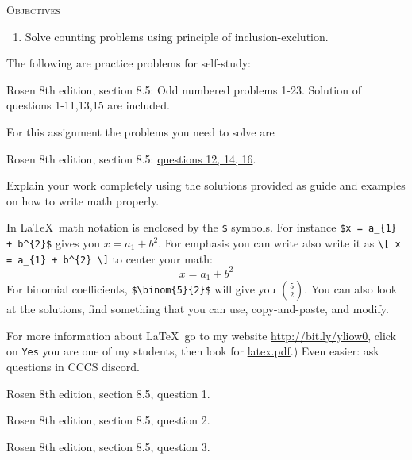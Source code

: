 


\renewcommand\AUTHOR{nweadick1@cougars.ccis.edu} %


\topmattertwo

\textsc{Objectives}
\begin{enumerate}
\item Solve counting problems using principle of
inclusion-exclution.
\end{enumerate}
\vspace{1cm}

The following are practice problems for self-study:
\begin{enumerate}[nosep]
\li Rosen 8th edition, section 8.5: Odd numbered problems 1-23.
Solution of questions 1-11,13,15 are included.
\end{enumerate}
For this assignment the problems you need to solve are
\begin{enumerate}[nosep]
\li Rosen 8th edition, section 8.5: \underline{questions 12, 14, 16}.
\end{enumerate}
Explain your work completely using the solutions provided as
guide and examples on how to write math properly.

In \LaTeX\, math notation is enclosed by the \verb!$! symbols.
For instance \verb!$x = a_{1} + b^{2}$! gives you $x = a_{1} + b^{2}$.
For emphasis you can write also write it as
\verb!\[ x = a_{1} + b^{2} \]!
to center your math:
\[
x = a_{1} + b^{2}
\]
For binomial coefficients, \verb!$\binom{5}{2}$! will give you 
$\binom{5}{2}$.
You can also look at the solutions, find something that you can use,
copy-and-paste, and modify.

For more information about \LaTeX\, go to my
website
\href{http://bit.ly/yliow0}{http://bit.ly/yliow0},
click on \verb!Yes!
you are one of my students,
then look for
\href{https://drive.google.com/file/d/0BzjYrK0VFuMWZm5xV0kyR3J2Zm8/view?usp=sharing}{latex.pdf}.)
Even easier: ask questions in CCCS discord.

\newpage
\nextq Rosen 8th edition, section 8.5, question 1.

\SOLUTION


\newpage
\nextq Rosen 8th edition, section 8.5, question 2.

\SOLUTION


\newpage
\nextq Rosen 8th edition, section 8.5, question 3.


